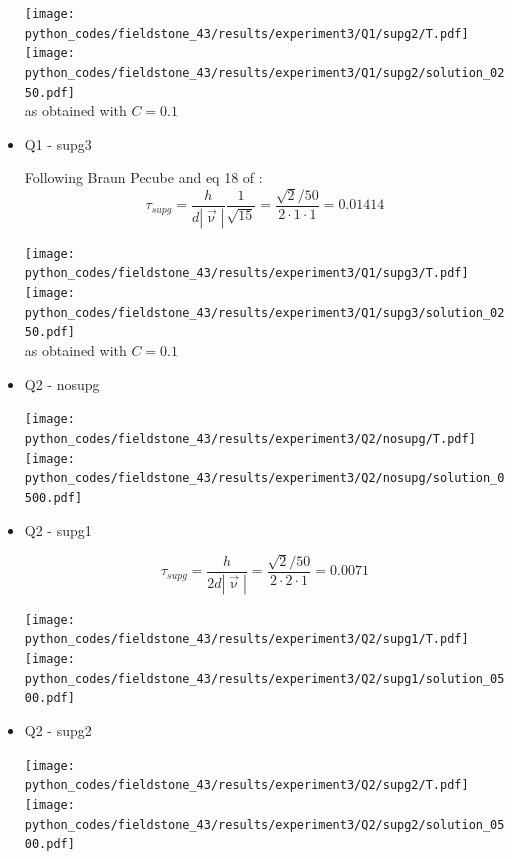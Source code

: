 \begin{itemize}
\begin{center}
\texttt{[image: python\_codes/fieldstone\_43/results/experiment3/Q1/supg2/T.pdf]}
\texttt{[image: python\_codes/fieldstone\_43/results/experiment3/Q1/supg2/solution\_0250.pdf]}\\
as obtained with $C=0.1$
\end{center}


\item Q1 - supg3 %

Following Braun Pecube and eq 18 of \cite{bogs04}:
\[
\tau_{supg} = \frac{h}{d |\vec{\upnu}|} \frac{1}{\sqrt{15}} = \frac{\sqrt{2}/50}{2 \cdot 1 \cdot 1} = 0.01414
\]

\begin{center}
\texttt{[image: python\_codes/fieldstone\_43/results/experiment3/Q1/supg3/T.pdf]}
\texttt{[image: python\_codes/fieldstone\_43/results/experiment3/Q1/supg3/solution\_0250.pdf]}\\
as obtained with $C=0.1$
\end{center}


\item Q2 - nosupg %

\begin{center}
\texttt{[image: python\_codes/fieldstone\_43/results/experiment3/Q2/nosupg/T.pdf]}
\texttt{[image: python\_codes/fieldstone\_43/results/experiment3/Q2/nosupg/solution\_0500.pdf]}
\end{center}

\item Q2 - supg1 %

\[
\tau_{supg} = \frac{h}{2 d |\vec{\upnu}|} = \frac{\sqrt{2}/50}{2 \cdot 2 \cdot 1} = 0.0071
\]

\begin{center}
\texttt{[image: python\_codes/fieldstone\_43/results/experiment3/Q2/supg1/T.pdf]}
\texttt{[image: python\_codes/fieldstone\_43/results/experiment3/Q2/supg1/solution\_0500.pdf]}
\end{center}

\item Q2 - supg2 %

\begin{center}
\texttt{[image: python\_codes/fieldstone\_43/results/experiment3/Q2/supg2/T.pdf]}
\texttt{[image: python\_codes/fieldstone\_43/results/experiment3/Q2/supg2/solution\_0500.pdf]}
\end{center}


\end{itemize}
